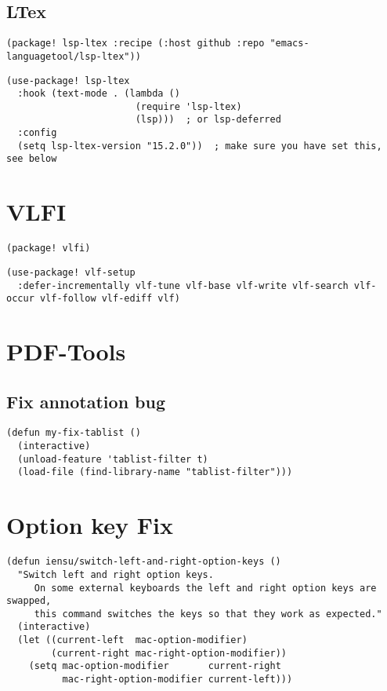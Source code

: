 \documentclass[c]{article}
\theoremstyle{plain}%
\theoremstyle{definition}
\theoremstyle{remark}
\begin{document}
\subsection{LTex}
\label{sec:org296c169}
\begin{verbatim}
(package! lsp-ltex :recipe (:host github :repo "emacs-languagetool/lsp-ltex"))
\end{verbatim}
\begin{verbatim}
(use-package! lsp-ltex
  :hook (text-mode . (lambda ()
                       (require 'lsp-ltex)
                       (lsp)))  ; or lsp-deferred
  :config
  (setq lsp-ltex-version "15.2.0"))  ; make sure you have set this, see below
\end{verbatim}
\section{VLFI}
\label{sec:orgc674a62}
\begin{verbatim}
(package! vlfi)
\end{verbatim}
\begin{verbatim}
(use-package! vlf-setup
  :defer-incrementally vlf-tune vlf-base vlf-write vlf-search vlf-occur vlf-follow vlf-ediff vlf)
\end{verbatim}

\section{PDF-Tools}
\label{sec:orgc0b8e17}
\subsection{Fix annotation bug}
\label{sec:org2d205fe}
\begin{verbatim}
(defun my-fix-tablist ()
  (interactive)
  (unload-feature 'tablist-filter t)
  (load-file (find-library-name "tablist-filter")))
\end{verbatim}
\section{Option key Fix}
\label{sec:orgccc0605}
\begin{verbatim}
(defun iensu/switch-left-and-right-option-keys ()
  "Switch left and right option keys.
     On some external keyboards the left and right option keys are swapped,
     this command switches the keys so that they work as expected."
  (interactive)
  (let ((current-left  mac-option-modifier)
        (current-right mac-right-option-modifier))
    (setq mac-option-modifier       current-right
          mac-right-option-modifier current-left)))
\end{verbatim}
\end{document}
